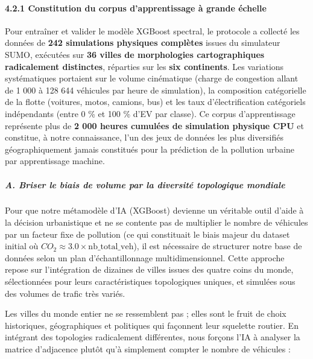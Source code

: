 \documentclass[10pt, a4paper]{article}
\begin{document}
\paragraph{4.2.1 Constitution du corpus d'apprentissage à grande
échelle}\label{constitution-du-corpus-dapprentissage-uxe0-grande-uxe9chelle}

Pour entraîner et valider le modèle XGBoost spectral, le protocole a
collecté les données de \textbf{242 simulations physiques complètes}
issues du simulateur SUMO, exécutées sur \textbf{36 villes de
morphologies cartographiques radicalement distinctes}, réparties sur les
\textbf{six continents}. Les variations systématiques portaient sur le
volume cinématique (charge de congestion allant de 1 000 à 128 644
véhicules par heure de simulation), la composition catégorielle de la
flotte (voitures, motos, camions, bus) et les taux d'électrification
catégoriels indépendants (entre 0 \% et 100 \% d'EV par classe). Ce
corpus d'apprentissage représente plus de \textbf{2 000 heures cumulées
de simulation physique CPU} et constitue, à notre connaissance, l'un des
jeux de données les plus diversifiés géographiquement jamais constitués
pour la prédiction de la pollution urbaine par apprentissage machine.

\subparagraph{A. Briser le biais de volume par la diversité topologique
mondiale}\label{a.-briser-le-biais-de-volume-par-la-diversituxe9-topologique-mondiale}

Pour que notre métamodèle d'IA (XGBoost) devienne un véritable outil
d'aide à la décision urbanistique et ne se contente pas de multiplier le
nombre de véhicules par un facteur fixe de pollution (ce qui constituait
le biais majeur du dataset initial où
\(CO_2 \approx 3.0 \times \text{nb\_total\_veh}\)), il est nécessaire de
structurer notre base de données selon un plan d'échantillonnage
multidimensionnel. Cette approche repose sur l'intégration de dizaines
de villes issues des quatre coins du monde, sélectionnées pour leurs
caractéristiques topologiques uniques, et simulées sous des volumes de
trafic très variés.

Les villes du monde entier ne se ressemblent pas ; elles sont le fruit
de choix historiques, géographiques et politiques qui façonnent leur
squelette routier. En intégrant des topologies radicalement différentes,
nous forçons l'IA à analyser la matrice d'adjacence plutôt qu'à
simplement compter le nombre de véhicules :
\end{document}
